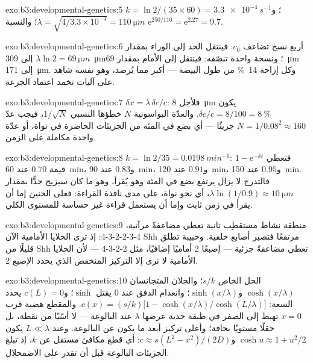 \begin{solution}{exo:b3:developmental-genetics:5}
$k = \ln 2/(35\times 60) = \qty{3.3e-4}{s^{-1}}$؛ و$\lambda = \sqrt{4/
3.3\times 10^{-4}} = \qty{110}{\micro m}$؛ والنسبة $\mathrm{e}^{250/110}
= \mathrm{e}^{2.27} = 9.7$.
\end{solution}

\begin{solution}{exo:b3:developmental-genetics:6}
أربع نسخ تضاعف $c_{0}$: فينتقل الحد إلى الوراء بمقدار $\lambda\ln 2 =
\qty{69}{\micro m}$ إلى \qty{309}{\micro m}؛ ونسخة واحدة تنصّفه:
فينتقل إلى الأمام بمقدار \qty{69}{\micro m} إلى \qty{171}{\micro m}.
وكل إزاحة \qty{14}{\%} من طول البيضة --- أكبر مما يُرصد، وهو
نفسه شاهد على آليات تخمد اعتماد الجرعة.
\end{solution}

\begin{solution}{exo:b3:developmental-genetics:7}
$\delta x = \lambda\,\delta c/c$: فلأجل \qty{8}{\micro m} يكون $\delta c/c =
8/100 = \qty{8}{\%}$. والعدّة البواسونية $N$ خطؤها
النسبي $1/\sqrt{N}$، فيجب عدّ $N = 1/0.08^{2} \approx 160$ جزيئًا
--- أي بضع في المئة من الجزيئات الحاضرة في نواة، أو عدّة
واحدة مكاملة على الزمن.
\end{solution}

\begin{solution}{exo:b3:developmental-genetics:8}
$k = \ln 2/35 = \qty{0.0198}{min^{-1}}$: فتعطي $1 - \mathrm{e}^{-kt}$
قيمة $0.70$ عند \qty{60}{min}، و$0.83$ عند \qty{90}{min}، و$0.91$ عند
\qty{120}{min}، و$0.95$ عند \qty{150}{min}. فالتدرج لا يزال يرتفع
بضع في المئة وهو يُقرأ، وهو ما كان سيزيح حدًّا بمقدار
$\lambda\ln(1/0.9) \approx \qty{10}{\micro m}$، أي نحو نواة، على
مدى نافذة القراءة: فعلى الجنين إما أن يقرأ في زمن ثابت وإما
أن يستعمل قراءة غير حساسة للمستوى الكلي.
\end{solution}

\begin{solution}{exo:b3:developmental-genetics:9}
منطقة نشاط مستقطِب ثانية تعطي مضاعفةً مرآتية، 4-3-2-2-3-4:
إذ ترى الخلايا الأمامية الآن Shh مرتفعًا فتصير أصابع خلفية.
وحبيبة تطلق قليلًا من Shh تعطي مضاعفةً جزئية --- إصبعًا 2
أماميًا إضافيًا، مثل 2-2-3-4 --- لأن الخلايا الأمامية لا ترى
إلا التركيز المنخفض الذي يحدد الإصبع 2.
\end{solution}

\begin{solution}{exo:b3:developmental-genetics:10}
الحل الخاص $s/k$؛ والحلان المتجانسان $\cosh(x/\lambda)$
و$\sinh(x/\lambda)$؛ وانعدام الدفق عند $0$ يقتل $\sinh$؛ و$c(L) = 0$
يحدد السعة: $c(x) = (s/k)\bigl[1 - \cosh(x/\lambda)/\cosh(L/\lambda)\bigr]$.
والمقطع هضبة قرب $x = 0$ تهبط إلى الصفر في طبقة حدية
عرضها $\lambda$ عند البالوعة --- لا أسّيًا من نقطة، بل حقلًا
مستويًا بحافة؛ وأعلى تركيز أبعد ما يكون عن البالوعة. وعند
$L \ll \lambda$ يكون $\cosh u \approx 1 +
u^{2}/2$ و$c \approx s(L^{2} - x^{2})/(2D)$: أي قطع مكافئ مستقل
عن $k$، إذ تبلغ الجزيئات البالوعة قبل أن تقدر على الاضمحلال.
\end{solution}

